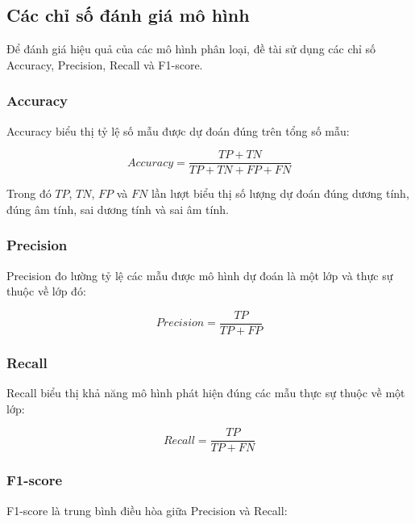 \documentclass[14pt]{extarticle}
\begin{document}
				\subsection{Các chỉ số đánh giá mô hình}
				
					\noindent Để đánh giá hiệu quả của các mô hình phân loại, đề tài sử dụng các chỉ số Accuracy, Precision, Recall và F1-score.
				
			\subsubsection{Accuracy}
				
					\noindent Accuracy biểu thị tỷ lệ số mẫu được dự đoán đúng trên tổng số mẫu:
				
				\begin{equation*}
					Accuracy =
					\frac{TP+TN}{TP+TN+FP+FN}
				\end{equation*}
				
				Trong đó $TP$, $TN$, $FP$ và $FN$ lần lượt biểu thị số lượng dự đoán
				đúng dương tính, đúng âm tính, sai dương tính và sai âm tính.
				
			\subsubsection{Precision}
				
					\noindent Precision đo lường tỷ lệ các mẫu được mô hình dự đoán là một lớp và thực sự thuộc về lớp đó:
				
				\begin{equation*}
					Precision =
					\frac{TP}{TP+FP}
				\end{equation*}
				
			\subsubsection{Recall}
				
					\noindent Recall biểu thị khả năng mô hình phát hiện đúng các mẫu thực sự thuộc về một lớp:
				
				\begin{equation*}
					Recall =
					\frac{TP}{TP+FN}
				\end{equation*}
				
				\subsubsection{F1-score}
				
				F1-score là trung bình điều hòa giữa Precision và Recall:
				
\end{document}
